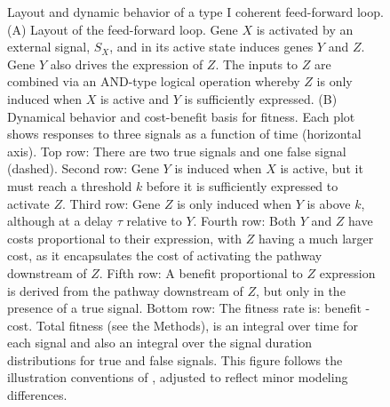 \documentclass[dvips,12pt,twoside,titlepage]{article}
\begin{document}
\begin{figure}[p]
\begin{center}
\caption{Layout and dynamic behavior of a type I coherent feed-forward loop. (A) Layout of the feed-forward loop. Gene $X$ is activated by an external signal, $S_X$, and in its active state induces genes $Y$ and $Z$. Gene $Y$ also drives the expression of $Z$. The inputs to $Z$ are combined via an AND-type logical operation whereby $Z$ is only induced when $X$ is active and $Y$ is sufficiently expressed. (B) Dynamical behavior and cost-benefit basis for fitness. Each plot shows responses to three signals as a function of time (horizontal axis). Top row: There are two true signals and one false signal (dashed). Second row: Gene $Y$ is induced when $X$ is active, but it must reach a threshold $k$ before it is sufficiently expressed to activate $Z$. Third row: Gene $Z$ is only induced when $Y$ is above $k$, although at a delay $\tau$ relative to $Y$. Fourth row: Both $Y$ and $Z$ have costs proportional to their expression, with $Z$ having a much larger cost, as it encapsulates the cost of activating the pathway downstream of $Z$. Fifth row: A benefit proportional to $Z$ expression is derived from the pathway downstream of $Z$, but only in the presence of a true signal. Bottom row: The fitness rate is: benefit - cost. Total fitness (see the Methods), is an integral over time for each signal and also an integral over the signal duration distributions for true and false signals. This figure follows the illustration conventions of \protect{}, adjusted to reflect minor modeling differences.}
\label{GeneCircuit}
\end{center}
\end{figure}
\clearpage
\end{document}

